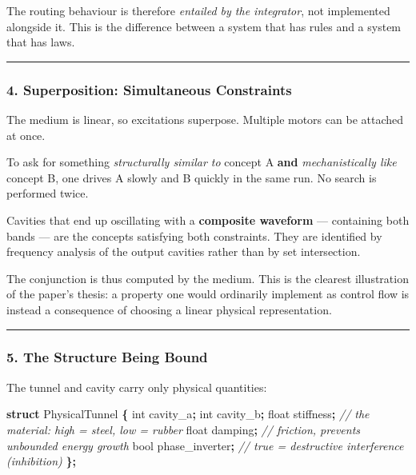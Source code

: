 \documentclass[
  11pt,
  a4paper,
]{article}
\newenvironment{Shaded}{\begin{snugshade}}{\end{snugshade}}
\newcommand{\CommentTok}[1]{\textcolor[rgb]{0.56,0.35,0.01}{\textit{#1}}}
\newcommand{\DataTypeTok}[1]{\textcolor[rgb]{0.13,0.29,0.53}{#1}}
\newcommand{\KeywordTok}[1]{\textcolor[rgb]{0.13,0.29,0.53}{\textbf{#1}}}
\newcommand{\NormalTok}[1]{#1}
\newcommand{\OperatorTok}[1]{\textcolor[rgb]{0.81,0.36,0.00}{\textbf{#1}}}
\begin{document}
The routing behaviour is therefore \emph{entailed by the integrator},
not implemented alongside it. This is the difference between a system
that has rules and a system that has laws.

\begin{center}\rule{0.5\linewidth}{0.5pt}\end{center}

\subsubsection{4. Superposition: Simultaneous
Constraints}\label{superposition-simultaneous-constraints}

The medium is linear, so excitations superpose. Multiple motors can be
attached at once.

To ask for something \emph{structurally similar to} concept A
\textbf{and} \emph{mechanistically like} concept B, one drives A slowly
and B quickly in the same run. No search is performed twice.

Cavities that end up oscillating with a \textbf{composite waveform} ---
containing both bands --- are the concepts satisfying both constraints.
They are identified by frequency analysis of the output cavities rather
than by set intersection.

The conjunction is thus computed by the medium. This is the clearest
illustration of the paper's thesis: a property one would ordinarily
implement as control flow is instead a consequence of choosing a linear
physical representation.

\begin{center}\rule{0.5\linewidth}{0.5pt}\end{center}

\subsubsection{5. The Structure Being
Bound}\label{the-structure-being-bound}

The tunnel and cavity carry only physical quantities:

\begin{Shaded}
\begin{Highlighting}[]
\KeywordTok{struct}\NormalTok{ PhysicalTunnel }\OperatorTok{\{}
    \DataTypeTok{int}\NormalTok{   cavity\_a}\OperatorTok{;}
    \DataTypeTok{int}\NormalTok{   cavity\_b}\OperatorTok{;}
    \DataTypeTok{float}\NormalTok{ stiffness}\OperatorTok{;}      \CommentTok{// the material: high = steel, low = rubber}
    \DataTypeTok{float}\NormalTok{ damping}\OperatorTok{;}        \CommentTok{// friction, prevents unbounded energy growth}
    \DataTypeTok{bool}\NormalTok{  phase\_inverter}\OperatorTok{;} \CommentTok{// true = destructive interference (inhibition)}
\OperatorTok{\};}
\end{Highlighting}
\end{Shaded}
\end{document}
